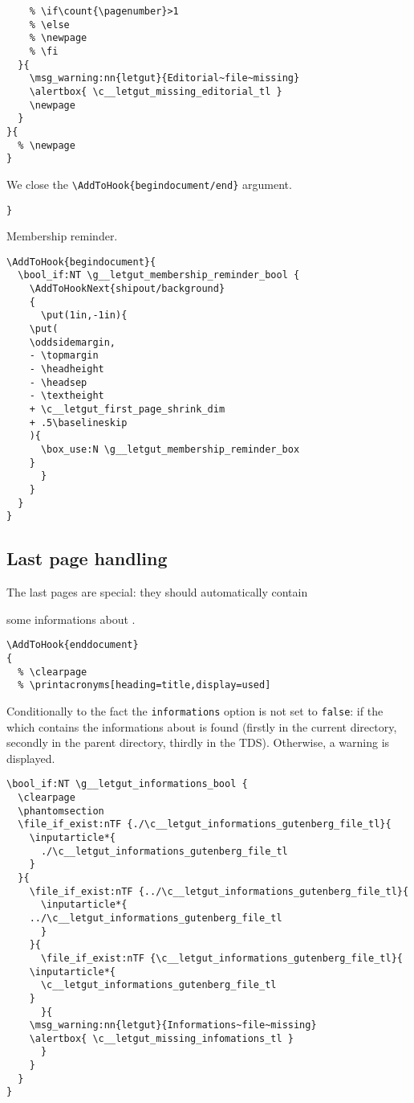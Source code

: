 \documentclass{letgut}
\begin{document}
\begin{lstlisting}
    % \if\count{\pagenumber}>1
    % \else
    % \newpage
    % \fi
  }{
    \msg_warning:nn{letgut}{Editorial~file~missing}
    \alertbox{ \c__letgut_missing_editorial_tl }
    \newpage
  }
}{
  % \newpage
}
\end{lstlisting}

We close the \lstinline+\AddToHook{begindocument/end}+ argument.

\begin{lstlisting}
}
\end{lstlisting}

Membership reminder.

\begin{lstlisting}
\AddToHook{begindocument}{
  \bool_if:NT \g__letgut_membership_reminder_bool {
    \AddToHookNext{shipout/background}
    {
      \put(1in,-1in){
	\put(
	\oddsidemargin,
	- \topmargin
	- \headheight
	- \headsep
	- \textheight
	+ \c__letgut_first_page_shrink_dim
	+ .5\baselineskip
	){
	  \box_use:N \g__letgut_membership_reminder_box
	}
      }
    }
  }
}
\end{lstlisting}

\subsection{Last page handling}
\label{ImplementationLastpagehandling-jbng55h0jlj0}
The last pages are special: they should automatically contain

some informations about \gutenberg.

\begin{lstlisting}
\AddToHook{enddocument}
{
  % \clearpage
  % \printacronyms[heading=title,display=used]
\end{lstlisting}
Conditionally to the fact the \lstinline+informations+ option is not set to \lstinline+false+: if
the  which contains the informations about
\gutenberg{} is found (firstly in the current directory, secondly in the parent
directory, thirdly in the TDS). Otherwise, a warning is displayed.
\begin{lstlisting}
\bool_if:NT \g__letgut_informations_bool {
  \clearpage
  \phantomsection
  \file_if_exist:nTF {./\c__letgut_informations_gutenberg_file_tl}{
    \inputarticle*{
      ./\c__letgut_informations_gutenberg_file_tl
    }
  }{
    \file_if_exist:nTF {../\c__letgut_informations_gutenberg_file_tl}{
      \inputarticle*{
	../\c__letgut_informations_gutenberg_file_tl
      }
    }{
      \file_if_exist:nTF {\c__letgut_informations_gutenberg_file_tl}{
	\inputarticle*{
	  \c__letgut_informations_gutenberg_file_tl
	}
      }{
	\msg_warning:nn{letgut}{Informations~file~missing}
	\alertbox{ \c__letgut_missing_infomations_tl }
      }
    }
  }
}
\end{lstlisting}
\end{document}
